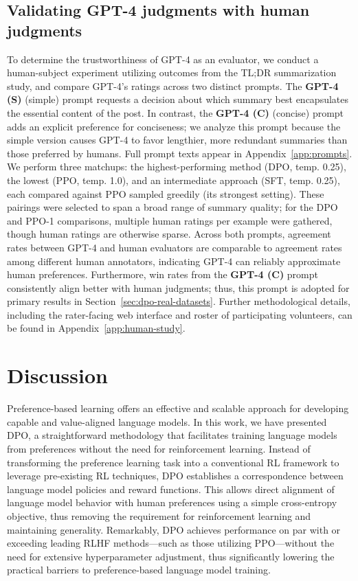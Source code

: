 \subsection{Validating GPT-4 judgments with human judgments}
\label{sec:human-judgments}
To determine the trustworthiness of GPT-4 as an evaluator, we conduct a human-subject experiment utilizing outcomes from the TL;DR summarization study, and compare GPT-4’s ratings across two distinct prompts. The \textbf{GPT-4 (S)} (simple) prompt requests a decision about which summary best encapsulates the essential content of the post. In contrast, the \textbf{GPT-4 (C)} (concise) prompt adds an explicit preference for conciseness; we analyze this prompt because the simple version causes GPT-4 to favor lengthier, more redundant summaries than those preferred by humans. Full prompt texts appear in Appendix~\ref{app:prompts}. We perform three matchups: the highest-performing method (DPO, temp. 0.25), the lowest (PPO, temp. 1.0), and an intermediate approach (SFT, temp. 0.25), each compared against PPO sampled greedily (its strongest setting). These pairings were selected to span a broad range of summary quality; for the DPO and PPO-1 comparisons, multiple human ratings per example were gathered, though human ratings are otherwise sparse. Across both prompts, agreement rates between GPT-4 and human evaluators are comparable to agreement rates among different human annotators, indicating GPT-4 can reliably approximate human preferences. Furthermore, win rates from the \textbf{GPT-4 (C)} prompt consistently align better with human judgments; thus, this prompt is adopted for primary results in Section~\ref{sec:dpo-real-datasets}. Further methodological details, including the rater-facing web interface and roster of participating volunteers, can be found in Appendix~\ref{app:human-study}.

\section{Discussion}
Preference-based learning offers an effective and scalable approach for developing capable and value-aligned language models. In this work, we have presented DPO, a straightforward methodology that facilitates training language models from preferences without the need for reinforcement learning. Instead of transforming the preference learning task into a conventional RL framework to leverage pre-existing RL techniques, DPO establishes a correspondence between language model policies and reward functions. This allows direct alignment of language model behavior with human preferences using a simple cross-entropy objective, thus removing the requirement for reinforcement learning and maintaining generality. Remarkably, DPO achieves performance on par with or exceeding leading RLHF methods—such as those utilizing PPO—without the need for extensive hyperparameter adjustment, thus significantly lowering the practical barriers to preference-based language model training.

